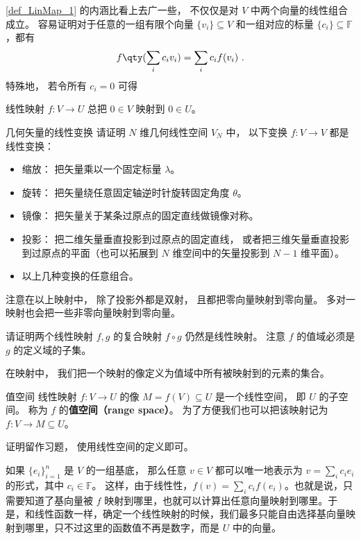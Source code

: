 \autoref{def_LinMap_1} 的内涵比看上去广一些， 不仅仅是对 $V$ 中两个向量的线性组合成立。 容易证明对于任意的一组有限个向量 $\{v_i\}\subseteq V$ 和一组对应的标量 $\{c_i\}\subseteq\mathbb{F}$，都有
\begin{equation}\label{eq_LinMap_1}
f\qty(\sum_i c_i v_i)=\sum_i c_i f(v_i)~.
\end{equation}
特殊地， 若令所有 $c_i = 0$ 可得
\begin{corollary}{}\label{cor_LinMap_1}
线性映射 $f:V\to U$ 总把 $0 \in V$ 映射到 $0 \in U$。
\end{corollary}

\begin{exercise}{几何矢量的线性变换}
请证明 $N$ 维几何线性空间 $V_N$ 中， 以下变换 $f:V\to V$ 都是线性变换：
\begin{itemize}
\item 缩放： 把矢量乘以一个固定标量 $\lambda$。
\item 旋转： 把矢量绕任意固定轴逆时针旋转固定角度 $\theta$。
\item 镜像： 把矢量关于某条过原点的固定直线做镜像对称。
\item 投影： 把二维矢量垂直投影到过原点的固定直线， 或者把三维矢量垂直投影到过原点的平面（也可以拓展到 $N$ 维空间中的矢量投影到 $N-1$ 维平面）。
\item 以上几种变换的任意组合。
\end{itemize}
\end{exercise}
注意在以上映射中， 除了投影外都是双射， 且都把零向量映射到零向量。 多对一映射也会把一些非零向量映射到零向量。

\begin{exercise}{}
请证明两个线性映射 $f, g$ 的复合映射 $f \circ g$ 仍然是线性映射。 注意 $f$ 的值域必须是 $g$ 的定义域的子集。
\end{exercise}

在映射中， 我们把一个映射的像定义为值域中所有被映射到的元素的集合。
\begin{theorem}{值空间}
线性映射 $f:V\to U$ 的像 $M = f(V) \subseteq U$ 是一个线性空间， 即 $U$ 的子空间。 称为 $f$ 的\textbf{值空间（range space）}。 为了方便我们也可以把该映射记为 $f: V\to M \subseteq U$。
\end{theorem}
证明留作习题， 使用线性空间的定义即可。

如果 $\{{e}_i\}_{i=1}^n$ 是 $V$ 的一组基底， 那么任意 $v\in V$ 都可以唯一地表示为 $v=\sum_i c_i {e}_i$ 的形式，其中 $c_i\in\mathbb{F}$。 这样，由于线性性，$f(v)=\sum_ic_if({e}_i)$。也就是说，只需要知道了基向量被 $f$ 映射到哪里，也就可以计算出任意向量映射到哪里。于是，和线性函数一样，确定一个线性映射的时候，我们最多只能自由选择基向量映射到哪里，只不过这里的函数值不再是数字，而是 $U$ 中的向量。

